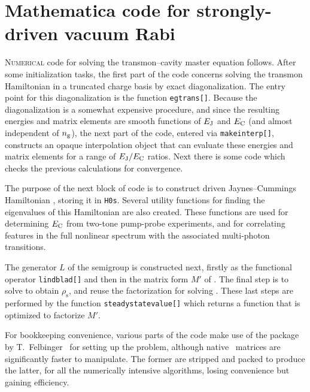 \chapter{%
    \texorpdfstring{Mathematica code for strongly-driven vacuum Rabi}%
    {Mathematica code: vacuum Rabi}}\label{ap:mma}%
%
\lettrine{N}{umerical} code for solving the transmon--cavity master equation  follows. After some initialization tasks, the first part of the code concerns solving the transmon Hamiltonian  in a truncated charge basis  by exact diagonalization. The entry point for this diagonalization is the function \texttt{egtrans[]}. Because the diagonalization is a somewhat expensive procedure, and since the resulting energies and matrix elements are smooth functions of $E_{\text{J}}$ and $E_{\text{C}}$ (and almost independent of $n_{\text{g}}$), the next part of the code, entered via \texttt{makeinterp[]}, constructs an opaque interpolation object that can evaluate these energies and matrix elements for a range of $E_{\text{J}}/E_{\text{C}}$ ratios. Next there is some code which checks the previous calculations for convergence.

The purpose of the next block of code is to construct driven Jaynes--Cummings Hamiltonian , storing it in \texttt{H0s}. Several utility functions for finding the eigenvalues of this Hamiltonian are also created. These functions are used for determining $E_{\text{C}}$ from two-tone pump-probe experiments, and for correlating features in the full nonlinear spectrum with the associated multi-photon transitions.

The generator $L$ of the semigroup is constructed next, firstly as the functional operator \texttt{lindblad[]} and then in the matrix form $M'$ of . The final step is to solve  to obtain $\rho_\text{s}$, and reuse the factorization for solving . These last steps are performed by the function \texttt{steadystatevalue[]} which returns a function that is optimized to factorize $M'$.

For bookkeeping convenience, various parts of the code make use of the  package by T.~Felbinger~\cite{qmatrix} for setting up the problem, although native \mma\ matrices are significantly faster to manipulate. The former are stripped and packed to produce the latter, for all the numerically intensive algorithms, losing convenience but gaining efficiency.


\edef\listopt{[pages=1-last,      %
            pagecommand={},    %
            offset=\xoff 0in,%
            trim=\xtrim 0.6in \xtrim 0.6in, %
            clip,              %
            quiet,
            thread]}
\expandafter{} 